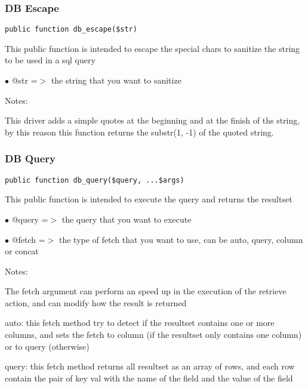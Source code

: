\documentclass[a4paper]{article}
\begin{document}
\hypertarget{toc331}{}
\subsubsection{DB Escape}

\begin{lstlisting}
public function db_escape($str)
\end{lstlisting}

This public function is intended to escape the special chars to sanitize the string to be used
in a sql query

\begin{compactitem}
\item[\color{myblue}$\bullet$] @str =$>$ the string that you want to sanitize
\end{compactitem}

Notes:

This driver adds a simple quotes at the beginning and at the finish of ths string, by this
reason this function returns the substr(1, -1) of the quoted string.

\hypertarget{toc332}{}
\subsubsection{DB Query}

\begin{lstlisting}
public function db_query($query, ...$args)
\end{lstlisting}

This public function is intended to execute the query and returns the resultset

\begin{compactitem}
\item[\color{myblue}$\bullet$] @query =$>$ the query that you want to execute
\item[\color{myblue}$\bullet$] @fetch =$>$ the type of fetch that you want to use, can be auto, query, column or concat
\end{compactitem}

Notes:

The fetch argument can perform an speed up in the execution of the retrieve action, and
can modify how the result is returned

auto: this fetch method try to detect if the resultset contains one or more columns, and
sets the fetch to column (if the resultset only contains one column) or to query (otherwise)

query: this fetch method returns all resultset as an array of rows, and each row contain the
pair of key val with the name of the field and the value of the field
\end{document}
